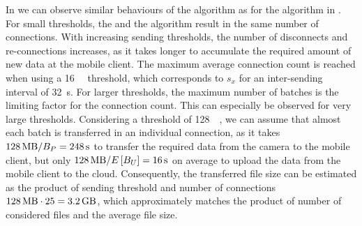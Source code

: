 In  we can observe similar behaviours of the \algosize algorithm as for the \algointerval algorithm in .
For small thresholds, the \algosize and the \algoimmediate algorithm result in the same number of connections.
With increasing sending thresholds, the number of disconnects and re-connections increases, as it takes longer to accumulate the required amount of new data at the mobile client.
The maximum average connection count is reached when using a \SI{16}{\mega\byte} threshold, which corresponds to \(s_x\) for an inter-sending interval of \SI{32}{\second}.
For larger thresholds, the maximum number of batches is the limiting factor for the connection count.
This can especially be observed for very large thresholds.
Considering a threshold of \SI{128}{\mega\byte}, we can assume that almost each batch is transferred in an individual connection, as it takes \(\SI{128}{\mega\byte} / \panTransferRate = \SI{248}{\second}\) to transfer the required data from the camera to the mobile client, but only \(\SI{128}{\mega\byte} / E\left[\uploadbandwidth\right] = \SI{16}{\second}\) on average to upload the data from the mobile client to the cloud.
Consequently, the transferred file size can be estimated as the product of sending threshold and number of connections \(\SI{128}{\mega\byte} \cdot 25 = \SI{3.2}{\giga\byte}\), which approximately matches the product of number of considered files and the average file size.

